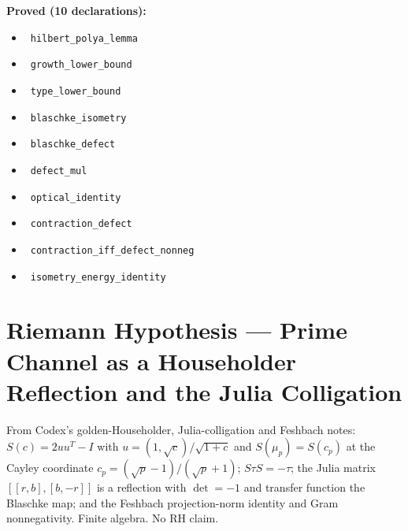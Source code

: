 \documentclass{report}
\theoremstyle{definition}
\begin{document}
\noindent\textbf{Proved (10 declarations):}
\begin{itemize}
  \item {}\leanok\ \texttt{hilbert\_polya\_lemma}
  \item {}\leanok\ \texttt{growth\_lower\_bound}
  \item {}\leanok\ \texttt{type\_lower\_bound}
  \item {}\leanok\ \texttt{blaschke\_isometry}
  \item {}\leanok\ \texttt{blaschke\_defect}
  \item {}\leanok\ \texttt{defect\_mul}
  \item {}\leanok\ \texttt{optical\_identity}
  \item {}\leanok\ \texttt{contraction\_defect}
  \item {}\leanok\ \texttt{contraction\_iff\_defect\_nonneg}
  \item {}\leanok\ \texttt{isometry\_energy\_identity}
\end{itemize}

\section{Riemann Hypothesis --- Prime Channel as a Householder Reflection and the Julia Colligation}
From Codex's golden-Householder, Julia-colligation and Feshbach notes: $S(c)=2uu^T-I$ with $u=(1,\sqrt c)/\sqrt{1+c}$ and $S(\mu_p)=S(c_p)$ at the Cayley coordinate $c_p=(\sqrt p-1)/(\sqrt p+1)$; $S\tau S=-\tau$; the Julia matrix $[[r,b],[b,-r]]$ is a reflection with $\det=-1$ and transfer function the Blaschke map; and the Feshbach projection-norm identity and Gram nonnegativity. Finite algebra. No RH claim.
\end{document}
